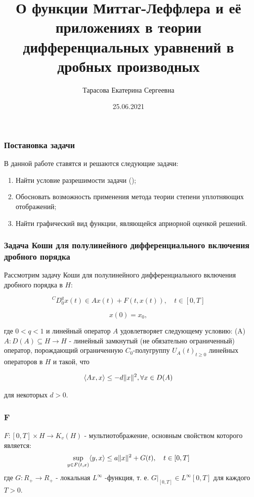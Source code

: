 \documentclass{beamer}
\title{О функции Миттаг-Леффлера и её приложениях в теории дифференциальных уравнений в дробных производных}
\date{25.06.2021}
\author{Тарасова Екатерина Сергеевна}
\DeclarePairedDelimiter{\norm}{\lVert}{\rVert}
\begin{document}
    \frame{\titlepage}

    \begin{frame}
        \frametitle{Постановка задачи}
        В данной работе ставятся и решаются следующие задачи:
        \begin{enumerate}
            \item Найти условие разрешимости задачи ();
            \item Обосновать возможность применения метода теории степени уплотняющих отображений;
            \item Найти графический вид функции, являющейся априорной оценкой решений.
        \end{enumerate}
    \end{frame}

    \begin{frame}
        \frametitle{Задача Коши для полулинейного дифференциального включения дробного порядка}
        Рассмотрим задачу Коши для полулинейного дифференциального включения дробного порядка в $H$:

        \begin{equation}
            \label{eq:cd_0q}
            {}^CD_{0}^{q}x(t) \in Ax(t) + F(t, x(t)), \quad t \in [0, T]
        \end{equation}

        \begin{equation}
            \label{eq:cd_0q_x0}
            x(0) = x_0,
        \end{equation}

        \noindent где $0 < q < 1$ и линейный оператор $A$ удовлетворяет следующему условию:
        (A) $A: D(A) \subseteq H \rightarrow H$ - линейный замкнутый (не обязательно ограниченный) оператор, порождающий ограниченную $C_0$-полугруппу
        ${U_A(t)}_{t \geq 0}$ линейных операторов в $H$ и такой, что

        \begin{equation*}
            \langle Ax, x \rangle \leq -d \norm{x}^2, \forall x \in D(A)
        \end{equation*}

        \noindent для некоторых $d > 0$.
    \end{frame}

    \begin{frame}
        \frametitle{F}
        $F: [0, T] \times H \rightarrow K_v(H)$ - мультиотображение, основным свойством которого является:
        \begin{equation*}
            \sup_{y \in F(t,x)} \langle y,x \rangle \leq a \norm{x}^2 + G(t), \quad t \in [0, T]
        \end{equation*}
        где $G: R_+ \rightarrow R_+$ - локальная $L^\infty$ -функция, т. е. $G|_{[0, T]} \in L^\infty[0, T]$ для каждого $T > 0$.
    \end{frame}
\end{document}
